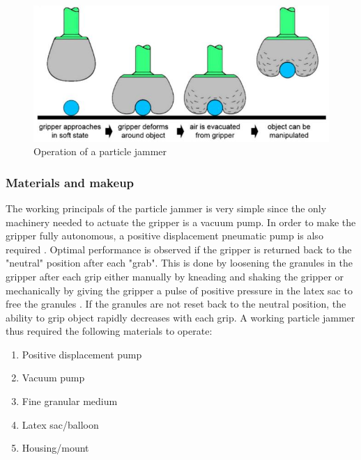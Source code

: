 \documentclass[11pt,twocolumn]{article}
\begin{document}
\begin{figure}[h]
\centering
\includegraphics[scale=0.6]{jammer2}
\caption{Operation of a particle jammer}
\label{fig:jammer2}
\end{figure}
\subsubsection{Materials and makeup}
The working principals of the particle jammer is very simple since the only machinery needed to actuate the gripper is a vacuum pump. In order to make the gripper fully autonomous, a positive displacement pneumatic pump is also required \cite{amend2012positive}. Optimal performance is observed if the gripper is returned back to the "neutral" position after each "grab". This is done by loosening the granules in the gripper after each grip either manually by kneading and shaking the gripper or mechanically by giving the gripper a pulse of positive pressure in the latex sac to free the granules \cite{amend2012positive}. If the granules are not reset back to the neutral position, the ability to grip object rapidly decreases with each grip. A working particle jammer thus required the following materials to operate\cite{amend2012positive}:
\begin{enumerate}
\item Positive displacement pump
\item Vacuum pump
\item Fine granular medium
\item Latex sac/balloon
\item Housing/mount
\end{enumerate}
\end{document}
